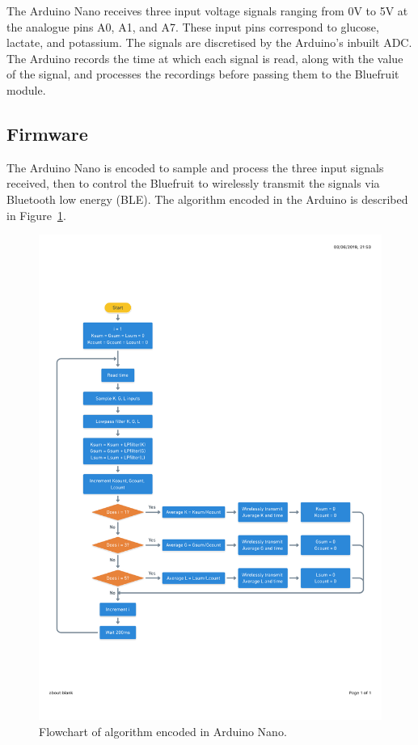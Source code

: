 The Arduino Nano receives three input voltage signals ranging from 0V to 5V at the analogue pins A0, A1, and A7. These input pins correspond to glucose, lactate, and potassium. The signals are discretised by the Arduino's inbuilt ADC. The Arduino records the time at which each signal is read, along with the value of the signal, and processes the recordings before passing them to the Bluefruit module.




\subsection{Firmware}
The Arduino Nano is encoded to sample and process the three input signals received, then to control the Bluefruit to wirelessly transmit the signals via Bluetooth low energy (BLE). The algorithm encoded in the Arduino is described in Figure~\ref{fig: psuedocode}.

\begin{figure}[t!]
\centering
\includegraphics[trim={1cm 5cm 1cm  4cm}, clip, width=1\textwidth]{./figures/psuedocode.pdf}
\captionsetup{justification=centering}
\caption{Flowchart of algorithm encoded in Arduino Nano.}
\label{fig: psuedocode}
\end{figure}


